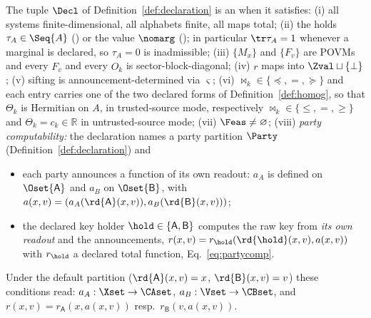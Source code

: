 \begin{definition}\label{def:admissible-declaration}
The tuple $\Decl$ of Definition~\ref{def:declaration} is an
when it satisfies: (i) all systems finite-dimensional, all
alphabets finite, all maps total; (ii) the  holds
$\tau_A\in\Seq{A}$ () or the value $\nomarg$
(); in particular $\tr\tau_A=1$ whenever a
marginal is declared, so $\tau_A=0$ is inadmissible;
(iii) $\{M_x\}$ and $\{F_v\}$ are POVMs and every $F_v$ and every
$\hat O_k$ is sector-block-diagonal; (iv) $r$ maps into
$\Zval\sqcup\{\perp\}$; (v) sifting is announcement-determined via
$\varsigma$; (vi) $\bowtie_k\in\{\preceq,=,\succeq\}$ and each entry
carries one of the two declared forms of Definition~\ref{def:homog}, so
that $\Theta_k$ is Hermitian on $A$, in trusted-source mode, respectively
$\bowtie_k\in\{\le,=,\ge\}$ and $\Theta_k=c_k\in\mathbb R$ in
untrusted-source mode; (vii) $\Feas\neq\varnothing$; (viii)
\emph{party computability:} the declaration names a party partition
$\Party$ (Definition~\ref{def:declaration}) and
\begin{itemize}[leftmargin=1.6em]
\item each party announces a function of its own readout: $a_A$ is
defined on $\Oset{\mathsf A}$ and $a_B$ on $\Oset{\mathsf B}$, with
$a(x,v)=(a_A(\rd{\mathsf A}(x,v)),a_B(\rd{\mathsf B}(x,v)))$;
\item the declared key holder $\hold\in\{\mathsf A,\mathsf B\}$
computes the raw key from \emph{its own readout} and the announcements,
$r(x,v)=r_{\hold}(\rd{\hold}(x,v),a(x,v))$ with $r_{\hold}$ a declared
total function, Eq.~\eqref{eq:partycomp}.
\end{itemize}
Under the default partition ($\rd{\mathsf A}(x,v)=x$,
$\rd{\mathsf B}(x,v)=v$) these conditions read:
$a_A:\Xset\to\CAset$, $a_B:\Vset\to\CBset$, and
$r(x,v)=r_{\mathsf A}(x,a(x,v))$ resp.\ $r_{\mathsf B}(v,a(x,v))$.


\end{definition}
